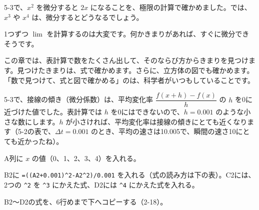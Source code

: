 \begin{hatena}
\noindent\begin{minipage}[c]{0.6\linewidth}
5-3で、$x^2$ を微分すると $2x$ になることを、極限の計算で確かめました。では、$x^3$ や $x^4$ は、微分するとどうなるでしょう。

1つずつ $\lim$ を計算するのは大変です。何かきまりがあれば、すぐに微分できそうです。
\end{minipage}\hfill
\begin{minipage}[c]{0.36\linewidth}
\end{minipage}
\end{hatena}

この章では、表計算で数をたくさん出して、そのならび方からきまりを見つけます。見つけたきまりは、式で確かめます。さらに、立方体の図でも確かめます。「数で見つけて、式と図で確かめる」のは、科学者がいつもしていることです。

\clearpage
\begin{yattemiyou}[表計算で接線の傾きをならべよう]
5-3で、接線の傾き（微分係数）は、平均変化率 $\dfrac{f(x+h)-f(x)}{h}$ の $h$ を0に近づけた値でした。表計算では $h$ を0にはできないので、$h=0.001$ のような小さな数にします。$h$ が小さければ、平均変化率は接線の傾きにとても近くなります（5-2の表で、$\Delta t=0.001$ のとき、平均の速さは10.005で、瞬間の速さ10にとても近かったね）。

\begin{enumerate}[label={\bkcircled[bkGreen]{\arabic*}}, leftmargin=2.4\zw, itemsep=1pt, topsep=3pt]
\item A列に $x$ の値（0、1、2、3、4）を入れる。
\item B2に \texttt{=((A2+0.001)\^{}2-A2\^{}2)/0.001} を入れる（式の読み方は下の表）。C2には、2つの \texttt{\^{}2} を \texttt{\^{}3} にかえた式、D2には \texttt{\^{}4} にかえた式を入れる。
\item B2〜D2の式を、6行めまで下へコピーする（2-18）。
\end{enumerate}
\end{yattemiyou}

